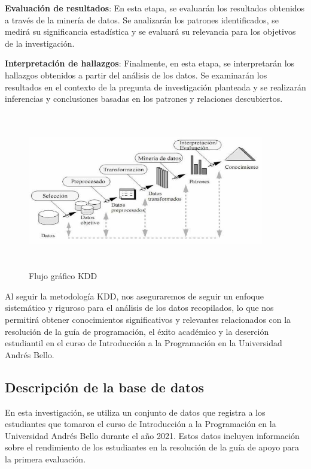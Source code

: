 \textbf{Evaluación de resultados}: En esta etapa, se evaluarán los resultados obtenidos a través de la minería de datos. Se analizarán los patrones identificados, se medirá su significancia estadística y se evaluará su relevancia para los objetivos de la investigación.

\textbf{Interpretación de hallazgos}: Finalmente, en esta etapa, se interpretarán los hallazgos obtenidos a partir del análisis de los datos. Se examinarán los resultados en el contexto de la pregunta de investigación planteada y se realizarán inferencias y conclusiones basadas en los patrones y relaciones descubiertos.

\begin{figure}[ht]
  \centering
  \includegraphics[width=4.06111in,height=2.68611in]{img/KDD.png}
  \caption{Flujo gráfico KDD}
  \label{fig:flujo_kdd}
\end{figure}

Al seguir la metodología KDD, nos aseguraremos de seguir un enfoque sistemático y riguroso para el análisis de los datos recopilados, lo que nos permitirá obtener conocimientos significativos y relevantes relacionados con la resolución de la guía de programación, el éxito académico y la deserción estudiantil en el curso de Introducción a la Programación en la Universidad Andrés Bello.


\subsection{Descripción de la base de datos}

En esta investigación, se utiliza un conjunto de datos que registra a los estudiantes que tomaron el 
curso de Introducción a la Programación en la Universidad Andrés Bello durante el año 2021. 
Estos datos incluyen información sobre el rendimiento de los estudiantes en la resolución de la guía de apoyo para la primera evaluación.

